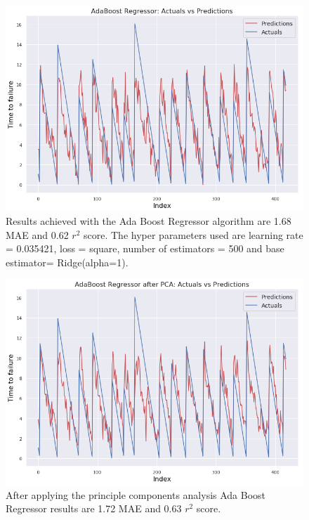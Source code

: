 \documentclass[]{llncs} %
\begin{document}
\begin{figure}[H]
	\centering
	\includegraphics[width=.9\linewidth]{results2}
	\caption{Results achieved with the Ada Boost Regressor algorithm are 1.68 MAE and 0.62 $r^2$ score. The hyper parameters used are learning rate = 0.035421, loss = square, number of estimators = 500 and base estimator= Ridge(alpha=1).}
	\label{fig:results2}
\end{figure}

\begin{figure}[H]
	\centering
	\includegraphics[width=.9\linewidth]{results2PCA}
	\caption{After applying the principle components analysis Ada Boost Regressor results are 1.72 MAE and 0.63 $r^2$ score.}
	\label{fig:results2PCA}
\end{figure}


\clearpage
\newpage
\end{document}
